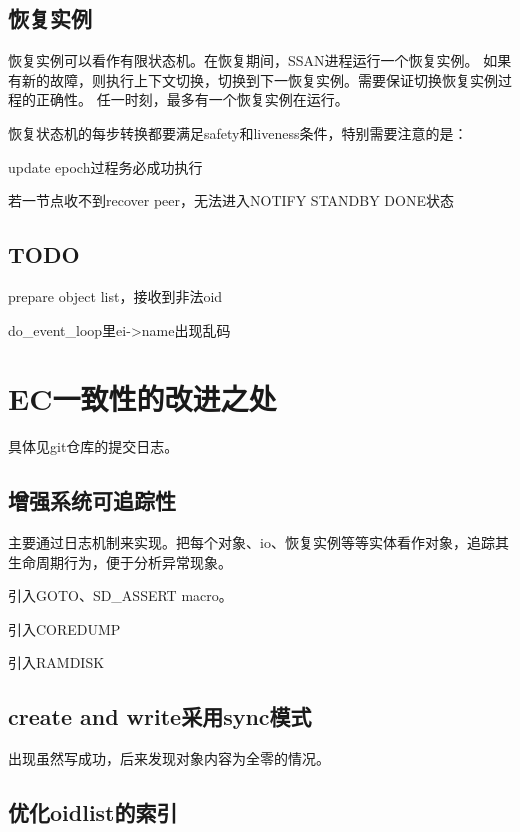 \subsection{恢复实例}

恢复实例可以看作有限状态机。在恢复期间，SSAN进程运行一个恢复实例。
如果有新的故障，则执行上下文切换，切换到下一恢复实例。需要保证切换恢复实例过程的正确性。
任一时刻，最多有一个恢复实例在运行。

恢复状态机的每步转换都要满足safety和liveness条件，特别需要注意的是：
\begin{enumbox}
\item update epoch过程务必成功执行
\item 若一节点收不到recover peer，无法进入NOTIFY STANDBY DONE状态
\end{enumbox}

\subsection{TODO}

\begin{enumbox}
\item prepare object list，接收到非法oid
\item do\_event\_loop里ei->name出现乱码
\end{enumbox}

\section{EC一致性的改进之处}

具体见git仓库的提交日志。

\subsection{增强系统可追踪性}

主要通过日志机制来实现。把每个对象、io、恢复实例等等实体看作对象，追踪其生命周期行为，便于分析异常现象。

引入GOTO、SD\_ASSERT macro。

引入COREDUMP

引入RAMDISK

\subsection{create and write采用sync模式}

出现虽然写成功，后来发现对象内容为全零的情况。

\subsection{优化oidlist的索引}

